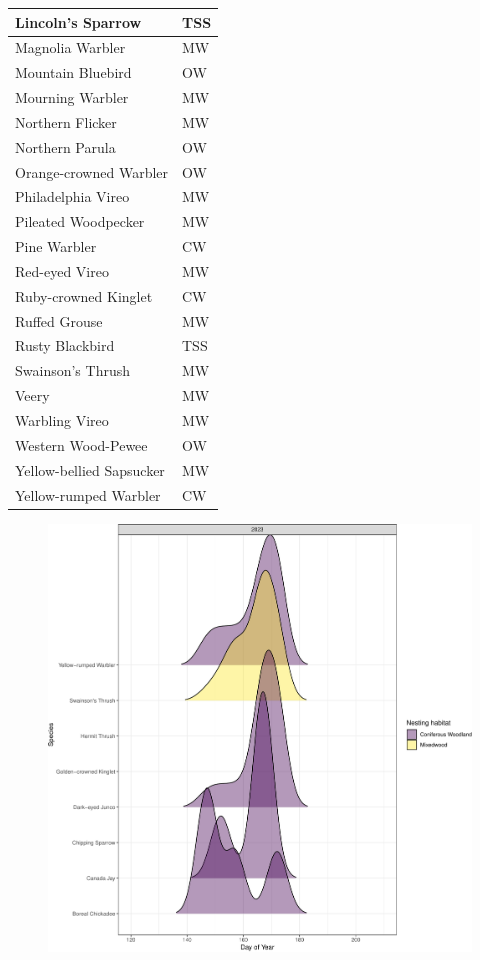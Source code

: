 \documentclass[
  letterpaper,
  DIV=11,
  numbers=noendperiod,
  oneside]{scrartcl}
\begin{document}
\begin{table}
\begin{tabular}{l|l}
\hline
Lincoln's Sparrow & TSS\\
\hline
Magnolia Warbler & MW\\
\hline
Mountain Bluebird & OW\\
\hline
Mourning Warbler & MW\\
\hline
Northern Flicker & MW\\
\hline
Northern Parula & OW\\
\hline
Orange-crowned Warbler & OW\\
\hline
Philadelphia Vireo & MW\\
\hline
Pileated Woodpecker & MW\\
\hline
Pine Warbler & CW\\
\hline
Red-eyed Vireo & MW\\
\hline
Ruby-crowned Kinglet & CW\\
\hline
Ruffed Grouse & MW\\
\hline
Rusty Blackbird & TSS\\
\hline
Swainson's Thrush & MW\\
\hline
Veery & MW\\
\hline
Warbling Vireo & MW\\
\hline
Western Wood-Pewee & OW\\
\hline
Yellow-bellied Sapsucker & MW\\
\hline
Yellow-rumped Warbler & CW\\
\hline
\end{tabular}
\end{table}

\begin{figure}


{\centering \includegraphics{knpr-pam_files/figure-pdf/fig-spp-activity-1.pdf}

}

\end{figure}
\end{document}
